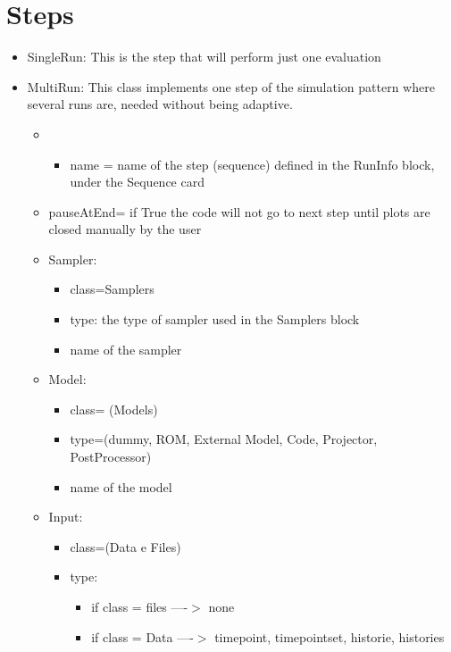 \section{Steps  \\ \vspace{2 mm} {\small }}


\begin{itemize}
\item SingleRun: This is the step that will perform just one evaluation
\item MultiRun: This class implements one step of the simulation pattern where several runs are, needed without being adaptive.  
\begin{itemize}
\item
	\begin{itemize}
	\item name = name of the step (sequence) defined in the RunInfo block, under the Sequence card
	\end{itemize}
\item pauseAtEnd= if True the code will not go to next step until plots are closed manually by the user
\end{itemize}
\begin{itemize}
\item Sampler: 
\begin {itemize}
\item class=Samplers 
\item type: the type of sampler used in the Samplers block 
\item name of the sampler
\end{itemize}
\item Model: 
\begin{itemize}
\item class= (Models) 
\item type=(dummy, ROM, External Model, Code, Projector, PostProcessor) 
\item name of the model
\end{itemize}
\item Input:  
\begin{itemize}
\item class=(Data e Files)
\item type:
\begin{itemize}
\item if class = files ----$>$ none
\item if class = Data  ----$>$ timepoint, timepointset, historie, histories

\end{itemize}
\end{itemize}
\end{itemize}
\end{itemize}

